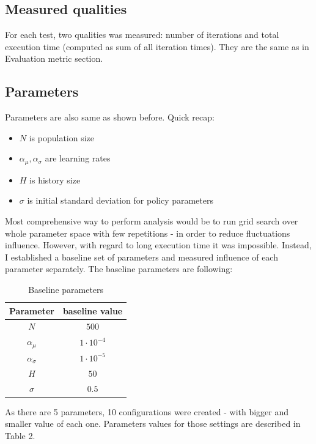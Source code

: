 \documentclass[12pt]{article}
\begin{document}
\subsection{Measured qualities}

For each test, two qualities was measured: number of iterations and total execution time (computed as sum of all iteration times). They are the same as in Evaluation metric section.

\subsection{Parameters}

Parameters are also same as shown before. Quick recap:

\begin{itemize}
\item $N$ is population size
\item $\alpha_\mu, \alpha_\sigma$ are learning rates
\item $H$ is history size
\item $\sigma$ is initial standard deviation for policy parameters

\end{itemize}

Most comprehensive way to perform analysis would be to run grid search over whole parameter space with few repetitions - in order to reduce fluctuations influence. However, with regard to long execution time it was impossible. Instead, I established a baseline set of parameters and measured influence of each parameter separately. The baseline parameters are following:

\begin{table}[!h]
\centering
\begin{tabular}{|c|c|}
\hline 
Parameter & baseline value \\
\hline 
$N$ & $500$ \\
\hline 
$\alpha_\mu$ & $1 \cdot 10^{-4}$ \\
\hline 
$\alpha_\sigma$ & $1 \cdot 10^{-5}$ \\
\hline 
$H$ & $50$ \\
\hline 
$\sigma$ & $0.5$ \\
\hline 
\end{tabular} 
\caption{Baseline parameters}
\end{table}

As there are 5 parameters, 10 configurations were created - with bigger and smaller value of each one. Parameters values for those settings are described in Table 2.
\end{document}
